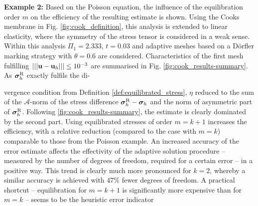 \begin{minipage}[t]{0.65\textwidth}
\textbf{Example 2:} Based on the Poisson equation, the influence of the equilibration order $m$ on the efficiency of the resulting estimate is shown.
Using the Cooks membrane in Fig. \ref{fig:cook_definition}, this analysis is extended to linear elasticity, where the symmetry of the stress tensor is considered in a weak sense.
Within this analysis $\Pi_1=2.333$, $t=0.03$ and adaptive meshes based on a Dörfler marking strategy with $\theta=0.6$ are considered.
Characteristics of the first mesh fulfilling $\vert\vert\vert \bm{\mathrm{u}} - \bm{\mathrm{u}}_h \vert\vert\vert \leq 10^{-3}$ are summarised in Fig. \ref{fig:cook_results-summary}. As $\bm{\sigma}^{\mathrm{R}}_h$ exactly fulfils the di-
\end{minipage}
\hfill
\begin{minipage}[t]{0.32\textwidth}
\centering{}
\label{fig:cook_definition}
\end{minipage}
vergence condition from Definition \ref{def:equilibrated_stress}, $\eta$ reduced to the sum of the $\mathcal{A}$-norm of the stress difference $\bm{\sigma}^{\mathrm{R}}_h - \bm{\sigma}_h$ and the norm of asymmetric part of $\bm{\sigma}^{\mathrm{R}}_h$. 
Following \ref{fig:cook_results-summary}, the estimate is clearly dominated by the second part.
Using equilibrated stresses of order $m=k+1$ increases the efficiency, with a relative reduction (compared to the case with $m=k$) comparable to those from the Poisson example.
An increased accuracy of the error estimate affects the effectivity of the adaptive solution procedure -- measured by the number of degrees of
freedom, required for a certain error -- in a positive way.
This trend is clearly much more pronounced for $k=2$, whereby a similar accuracy is achieved with $47\%$ fewer degrees of freedom.
A practical shortcut -- equilibration for $m=k+1$ is significantly more expensive than for $m=k$ -- seems to be the heuristic error indicator
